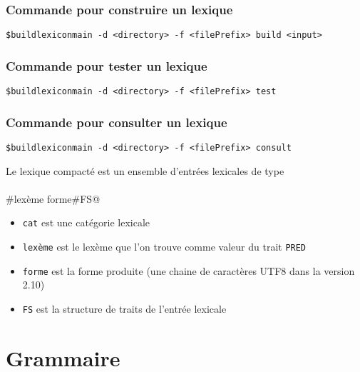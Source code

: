 \documentclass[11pt]{article}
\begin{document}
\subsubsection*{Commande pour construire un lexique}

\begin{description}
\item \verb#$buildlexiconmain -d <directory> -f <filePrefix> build <input># 
\end{description}

\subsubsection*{Commande pour tester un lexique}

\begin{description}
\item \verb#$buildlexiconmain -d <directory> -f <filePrefix> test# 

\subsubsection*{Commande pour consulter un lexique}

\item \verb#$buildlexiconmain -d <directory> -f <filePrefix> consult# 

\end{description}

Le lexique compacté est un ensemble d'entrées lexicales de type

\paragraph{}\verb@cat#lexème	forme#FS@

\begin{itemize}
\item \verb#cat# est une catégorie lexicale
\item \verb#lexème# est le lexème que l'on trouve comme valeur du
  trait \verb#PRED#
\item \verb#forme# est la forme produite (une chaine de caractères
  UTF8 dans la version 2.10)
\item \verb#FS# est la structure de traits de l'entrée lexicale
\end{itemize}

\newpage
\section{Grammaire}
\end{document}
